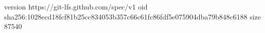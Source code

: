 version https://git-lfs.github.com/spec/v1
oid sha256:1028ecd18fcf81b25cc834053b357c66c61fc86fdf5e075904dba79b848c6188
size 87540

